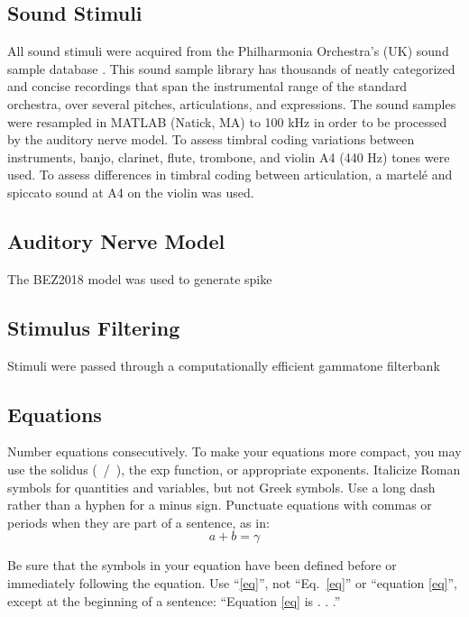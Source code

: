 \documentclass[conference]{IEEEtran}
\begin{document}
\subsection{Sound Stimuli}

All sound stimuli were acquired from the Philharmonia Orchestra's (UK) sound sample database \cite{noauthor_sound_nodate}. This sound sample library has thousands of neatly categorized and concise recordings that span the instrumental range of the standard orchestra, over several pitches, articulations, and expressions. The sound samples were resampled in MATLAB (Natick, MA) to 100 kHz in order to be processed by the auditory nerve model. To assess timbral coding variations between instruments, banjo, clarinet, flute, trombone, and violin A4 (440 Hz) tones were used. To assess differences in timbral coding between articulation, a martel\'{e} and spiccato sound at A4 on the violin was used.  

\subsection{Auditory Nerve Model}
The BEZ2018 model was used to generate spike 


\subsection{Stimulus Filtering}

Stimuli were passed through a computationally efficient gammatone filterbank 





\subsection{Equations}
Number equations consecutively. To make your 
equations more compact, you may use the solidus (~/~), the exp function, or 
appropriate exponents. Italicize Roman symbols for quantities and variables, 
but not Greek symbols. Use a long dash rather than a hyphen for a minus 
sign. Punctuate equations with commas or periods when they are part of a 
sentence, as in:
\begin{equation}
a+b=\gamma\label{eq}
\end{equation}

Be sure that the 
symbols in your equation have been defined before or immediately following 
the equation. Use ``\eqref{eq}'', not ``Eq.~\eqref{eq}'' or ``equation \eqref{eq}'', except at 
the beginning of a sentence: ``Equation \eqref{eq} is . . .''
\end{document}
